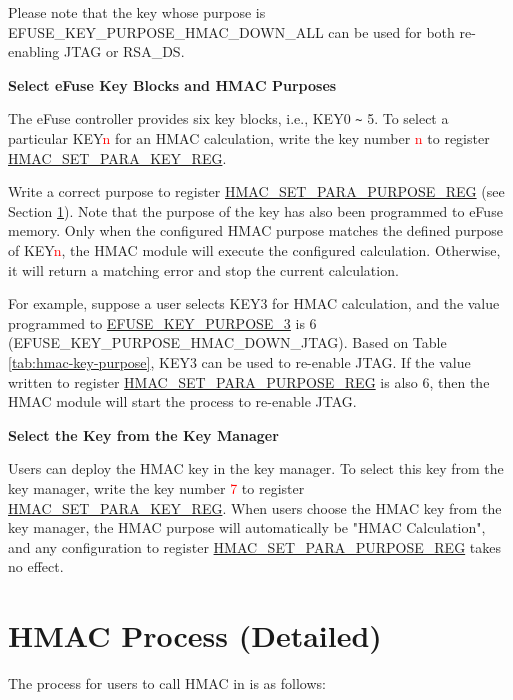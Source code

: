 \documentclass[main\_\_EN.tex]{subfiles}
\begin{document}
Please note that the key whose purpose is EFUSE\_KEY\_PURPOSE\_HMAC\_DOWN\_ALL can be used for both re-enabling JTAG or RSA\_DS.



\textbf{Select eFuse Key Blocks and HMAC Purposes}
\label{sec:hmac-config-purposes}

The eFuse controller provides six key blocks, i.e., KEY0 \verb+~+ 5. To select a particular KEY\textcolor{red}{n} for an HMAC calculation, write the key number \textcolor{red}{n} to register \hyperref[regdesc:HMACSETPARAKEYREG]{HMAC\_SET\_PARA\_KEY\_REG}.

Write a correct purpose to register \hyperref[regdesc:HMACSETPARAPURPOSEREG]{HMAC\_SET\_PARA\_PURPOSE\_REG} (see Section \ref{sec:hmac-process-detailed}). Note that the purpose of the key has also been programmed to eFuse memory. Only when the configured HMAC purpose matches the defined purpose of KEY\textcolor{red}{n}, the HMAC module will execute the configured calculation. Otherwise, it will return a matching error and stop the current calculation.

For example, suppose a user selects KEY3 for HMAC calculation, and the value programmed to \hyperref[fielddesc:EFUSEKEYPURPOSE3]{EFUSE\_KEY\_PURPOSE\_3} is 6 (EFUSE\_KEY\_PURPOSE\_HMAC\_DOWN\_JTAG). Based on Table \ref{tab:hmac-key-purpose}, KEY3 can be used to re-enable JTAG. If the value written to register \hyperref[regdesc:HMACSETPARAPURPOSEREG]{HMAC\_SET\_PARA\_PURPOSE\_REG} is also 6, then the HMAC module will start the process to re-enable JTAG.

\textbf{Select the Key from the Key Manager\\}
\label{sec:hmac-config-km-key}

Users can deploy the HMAC key in the key manager. To select this key from the key manager, write the key number \textcolor{red}{7} to register \hyperref[regdesc:HMACSETPARAKEYREG]{HMAC\_SET\_PARA\_KEY\_REG}. When users choose the HMAC key from the key manager, the HMAC purpose will automatically be "HMAC Calculation", and any configuration to register \hyperref[regdesc:HMACSETPARAPURPOSEREG]{HMAC\_SET\_PARA\_PURPOSE\_REG} takes no effect.

\section{HMAC Process (Detailed)}
\label{sec:hmac-process-detailed}

The process for users to call HMAC in \chipname{} is as follows:
\end{document}
